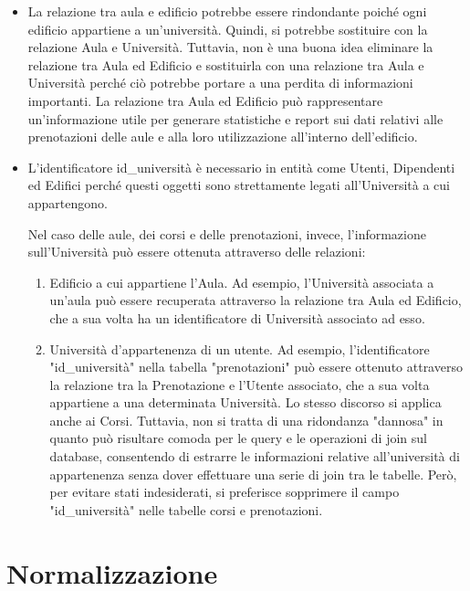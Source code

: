 \documentclass[a4paper, 10pt, oneside]{article} %
\begin{document}
\begin{itemize}
    \item La relazione tra aula e edificio potrebbe essere rindondante poiché ogni edificio appartiene a un'università. Quindi, si potrebbe sostituire con la relazione Aula e Università. Tuttavia, non è una buona idea eliminare la relazione tra Aula ed Edificio e sostituirla con una relazione tra Aula e Università perché ciò potrebbe portare a una perdita di informazioni importanti. La relazione tra Aula ed Edificio può rappresentare un'informazione utile per generare statistiche e report sui dati relativi alle prenotazioni delle aule e alla loro utilizzazione all'interno dell'edificio. 

    \item L'identificatore id\_università è necessario in entità come Utenti, Dipendenti ed Edifici perché questi oggetti sono strettamente legati all'Università a cui appartengono.

    Nel caso delle aule, dei corsi e delle prenotazioni, invece, l'informazione sull'Università può essere ottenuta attraverso delle relazioni:
    
    \begin{enumerate}
        \item Edificio a cui appartiene l'Aula. Ad esempio, l'Università associata a un'aula può essere recuperata attraverso la relazione tra Aula ed Edificio, che a sua volta ha un identificatore di Università associato ad esso.
        \item Università d'appartenenza di un utente. Ad esempio, l'identificatore "id\_università" nella tabella "prenotazioni" può essere ottenuto attraverso la relazione tra la Prenotazione e l'Utente associato, che a sua volta appartiene a una determinata Università. Lo stesso discorso si applica anche ai Corsi. Tuttavia, non si tratta di una ridondanza "dannosa" in quanto può risultare comoda per le query e le operazioni di join sul database, consentendo di estrarre le informazioni relative all'università di appartenenza senza dover effettuare una serie di join tra le tabelle. Però, per evitare stati indesiderati, si preferisce sopprimere il campo "id\_università" nelle tabelle corsi e prenotazioni.
    \end{enumerate}
\end{itemize}


\section{Normalizzazione}
\end{document}
